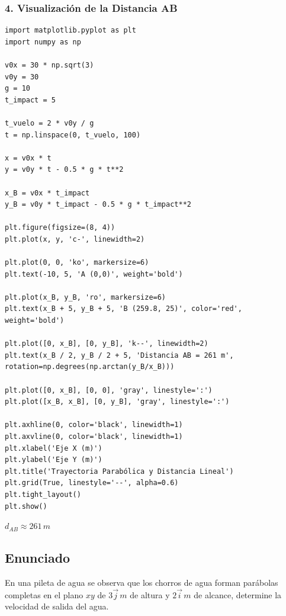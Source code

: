 \documentclass[12pt, a4paper]{article}
\begin{document}
\subsubsection*{4. Visualización de la Distancia AB}
\begin{verbatim}
import matplotlib.pyplot as plt
import numpy as np

v0x = 30 * np.sqrt(3)
v0y = 30
g = 10
t_impact = 5

t_vuelo = 2 * v0y / g
t = np.linspace(0, t_vuelo, 100)

x = v0x * t
y = v0y * t - 0.5 * g * t**2

x_B = v0x * t_impact
y_B = v0y * t_impact - 0.5 * g * t_impact**2

plt.figure(figsize=(8, 4))
plt.plot(x, y, 'c-', linewidth=2)

plt.plot(0, 0, 'ko', markersize=6)
plt.text(-10, 5, 'A (0,0)', weight='bold')

plt.plot(x_B, y_B, 'ro', markersize=6)
plt.text(x_B + 5, y_B + 5, 'B (259.8, 25)', color='red', weight='bold')

plt.plot([0, x_B], [0, y_B], 'k--', linewidth=2)
plt.text(x_B / 2, y_B / 2 + 5, 'Distancia AB = 261 m', rotation=np.degrees(np.arctan(y_B/x_B)))

plt.plot([0, x_B], [0, 0], 'gray', linestyle=':')
plt.plot([x_B, x_B], [0, y_B], 'gray', linestyle=':')

plt.axhline(0, color='black', linewidth=1)
plt.axvline(0, color='black', linewidth=1)
plt.xlabel('Eje X (m)')
plt.ylabel('Eje Y (m)')
plt.title('Trayectoria Parabólica y Distancia Lineal')
plt.grid(True, linestyle='--', alpha=0.6)
plt.tight_layout()
plt.show()
\end{verbatim}

\begin{tcolorbox}[colback=green!5!white, colframe=green!50!black, title=Respuesta Final]
\centering \Large $d_{AB} \approx 261 \, \si{m}$
\end{tcolorbox}

\newpage

\subsection*{Enunciado}
En una pileta de agua se observa que los chorros de agua forman parábolas completas en el plano $xy$ de $3\vec{j} \, \si{m}$ de altura y $2\vec{i} \, \si{m}$ de alcance, determine la velocidad de salida del agua.

\begin{center}
\end{center}
\end{document}
